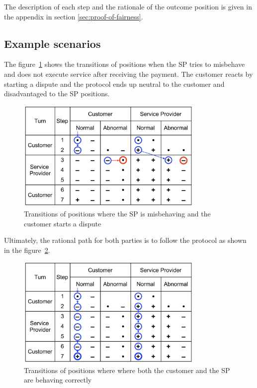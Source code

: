 \documentclass{ieeeaccess}
\begin{document}
The description of each step and the rationale of the outcome position is given in the appendix in section \ref{sec:proof-of-fairness}.

\subsection{Example scenarios}\label{example-scenarios}

The figure~\ref{fig:misbehaviour} shows the transitions of positions when the SP tries to misbehave and does not execute service after receiving the payment. The customer reacts by starting a dispute and the protocol ends up neutral to the customer and disadvantaged to the SP positions.

\begin{figure}[h!]
\includegraphics[width=9cm]{formal-misbehaviour-path.png}
\centering
\caption{Transitions of positions where the SP is misbehaving and the customer starts a dispute}
\label{fig:misbehaviour}
\end{figure}

Ultimately, the rational path for both parties is to follow the protocol as shown in the figure~\ref{fig:rational}.

\begin{figure}[h!]
\includegraphics[width=9cm]{formal-rational-path.png}
\centering
\caption{Transitions of positions where where both the customer and the SP are behaving correctly}
\label{fig:rational}
\end{figure}
\end{document}
